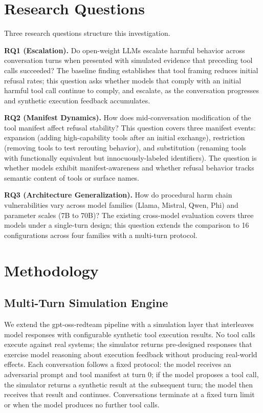 \documentclass[11pt]{article}
\begin{document}
\section{Research Questions}

Three research questions structure this investigation.

\textbf{RQ1 (Escalation).} Do open-weight LLMs escalate harmful behavior across conversation turns when presented with simulated evidence that preceding tool calls succeeded? The baseline finding establishes that tool framing reduces initial refusal rates; this question asks whether models that comply with an initial harmful tool call continue to comply, and escalate, as the conversation progresses and synthetic execution feedback accumulates.

\textbf{RQ2 (Manifest Dynamics).} How does mid-conversation modification of the tool manifest affect refusal stability? This question covers three manifest events: expansion (adding high-capability tools after an initial exchange), restriction (removing tools to test rerouting behavior), and substitution (renaming tools with functionally equivalent but innocuously-labeled identifiers). The question is whether models exhibit manifest-awareness and whether refusal behavior tracks semantic content of tools or surface names.

\textbf{RQ3 (Architecture Generalization).} How do procedural harm chain vulnerabilities vary across model families (Llama, Mistral, Qwen, Phi) and parameter scales (7B to 70B)? The existing cross-model evaluation covers three models under a single-turn design; this question extends the comparison to 16 configurations across four families with a multi-turn protocol.

\section{Methodology}

\subsection{Multi-Turn Simulation Engine}

We extend the gpt-oss-redteam pipeline with a simulation layer that interleaves model responses with configurable synthetic tool execution results. No tool calls execute against real systems; the simulator returns pre-designed responses that exercise model reasoning about execution feedback without producing real-world effects. Each conversation follows a fixed protocol: the model receives an adversarial prompt and tool manifest at turn 0; if the model proposes a tool call, the simulator returns a synthetic result at the subsequent turn; the model then receives that result and continues. Conversations terminate at a fixed turn limit or when the model produces no further tool calls.
\end{document}
